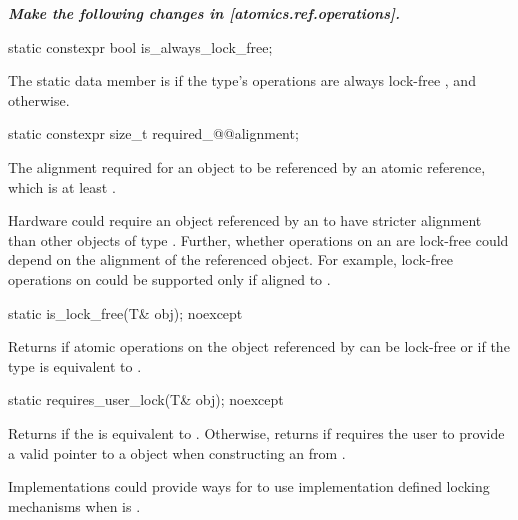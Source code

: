 \textbf{\textit{Make the following changes in [atomics.ref.operations].}} \\

\begin{itemdecl}
static constexpr bool is_always_lock_free;
\end{itemdecl}

\begin{itemdescr}
\pnum
The static data member  is 
if the  type's operations are always lock-free
,
and  otherwise.
\end{itemdescr}

\begin{itemdecl}
static constexpr size_t required_@@alignment;
\end{itemdecl}

\begin{itemdescr}
\pnum
The alignment required for an object to be referenced  by an atomic reference,
which is at least .

\pnum
\begin{note}
Hardware could require an object
referenced by an 
to have stricter alignment
than other objects of type .
Further, whether operations on an 
are lock-free could depend on the alignment of the referenced object.
For example, lock-free operations on 
could be supported only if aligned to .
\end{note}
\end{itemdescr}

\begin{addedblock}
\begin{itemdecl}
static is_lock_free(T& obj); noexcept
\end{itemdecl}

\begin{itemdescr}
\returns Returns  if atomic operations on the object referenced by
 can be lock-free or if the  type is equivalent to 
.
\end{itemdescr}

\begin{itemdecl}
static requires_user_lock(T& obj); noexcept
\end{itemdecl}

\begin{itemdescr}
\returns Returns  if the  is equivalent to .
Otherwise, returns  if  requires the user to
provide a valid pointer to a  object when constructing an 
 from . 
\begin{note}
Implementations could provide ways for  to use 
implementation defined locking mechanisms when  is .
\end{note}
\end{itemdescr}
\end{addedblock}

